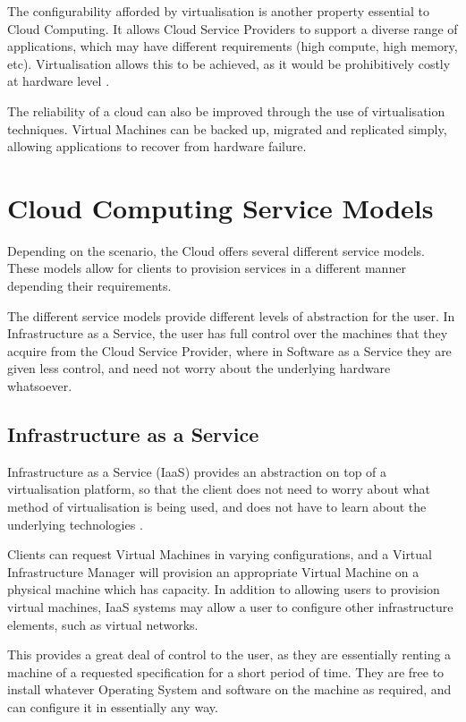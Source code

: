 The configurability afforded by virtualisation is another property essential to Cloud Computing. It allows Cloud Service Providers to support a diverse range of applications, which may have different requirements (high compute, high memory, etc). Virtualisation allows this to be achieved, as it would be prohibitively costly at hardware level \cite{foster2008cloud}. 

The reliability of a cloud can also be improved through the use of virtualisation techniques. Virtual Machines can be backed up, migrated and replicated simply, allowing applications to recover from hardware failure. 

\section{Cloud Computing Service Models}
Depending on the scenario, the Cloud offers several different service models. These models allow for clients to provision services in a different manner depending their requirements.

The different service models provide different levels of abstraction for the user. In Infrastructure as a Service, the user has full control over the machines that they acquire from the Cloud Service Provider, where in Software as a Service they are given less control, and need not worry about the underlying hardware whatsoever.

\subsection{Infrastructure as a Service}
Infrastructure as a Service (IaaS) provides an abstraction on top of a virtualisation platform, so that the client does not need to worry about what method of virtualisation is being used, and does not have to learn about the underlying technologies \cite{amies2012}.

Clients can request Virtual Machines in varying configurations, and a Virtual Infrastructure Manager will provision an appropriate Virtual Machine on a physical machine which has capacity. In addition to allowing users to provision virtual machines, IaaS systems may allow a user to configure other infrastructure elements, such as virtual networks. 

This provides a great deal of control to the user, as they are essentially renting a machine of a requested specification for a short period of time. They are free to install whatever Operating System and software on the machine as required, and can configure it in essentially any way. 

